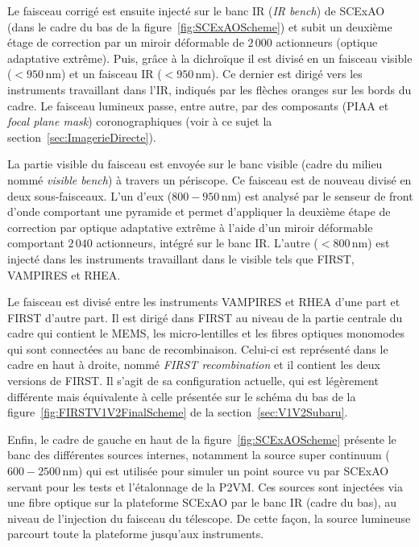 Le faisceau corrigé est ensuite injecté sur le banc \ac{IR} (\textit{IR bench}) de \ac{SCExAO} (dans le cadre du bas de la figure~\ref{fig:SCExAOScheme}) et subit un deuxième étage de correction par un miroir déformable de $2\,000$ actionneurs (optique adaptative extrême). Puis, grâce à la dichroïque il est divisé en un faisceau visible ($< 950 \,$nm) et un faisceau \ac{IR} ($< 950 \,$nm). Ce dernier est dirigé vers les instruments travaillant dans l'\ac{IR}, indiqués par les flèches oranges sur les bords du cadre. Le faisceau lumineux passe, entre autre, par des composants (\ac{PIAA} et \textit{focal plane mask}) coronographiques (voir à ce sujet la section~\ref{sec:ImagerieDirecte}).

La partie visible du faisceau est envoyée sur le banc visible (cadre du milieu nommé \textit{visible bench}) à travers un périscope. Ce faisceau est de nouveau divisé en deux sous-faisceaux. L'un d'eux ($800 - 950 \,$nm) est analysé par le senseur de front d'onde comportant une pyramide \citep{lozi2019} et permet d'appliquer la deuxième étape de correction par optique adaptative extrême à l'aide d'un miroir déformable comportant $2\,040$ actionneurs, intégré sur le banc \ac{IR}. L'autre ($< 800 \,$nm) est injecté dans les instruments travaillant dans le visible tels que \ac{FIRST}, \ac{VAMPIRES} et \ac{RHEA}.

Le faisceau est divisé entre les instruments \ac{VAMPIRES} et \ac{RHEA} d'une part et \ac{FIRST} d'autre part. Il est dirigé dans \ac{FIRST} au niveau de la partie centrale du cadre qui contient le \ac{MEMS}, les micro-lentilles et les fibres optiques monomodes qui sont connectées au banc de recombinaison. Celui-ci est représenté dans le cadre en haut à droite, nommé \textit{FIRST recombination} et il contient les deux versions de \ac{FIRST}. Il s'agit de sa configuration actuelle, qui est légèrement différente mais équivalente à celle présentée sur le schéma du bas de la figure~\ref{fig:FIRSTV1V2FinalScheme} de la section~\ref{sec:V1V2Subaru}.

Enfin, le cadre de gauche en haut de la figure~\ref{fig:SCExAOScheme} présente le banc des différentes sources internes, notamment la source super continuum ($600 - 2500 \,$nm) qui est utilisée pour simuler un point source vu par \ac{SCExAO} servant pour les tests et l'étalonnage de la \ac{P2VM}. Ces sources sont injectées via une fibre optique sur la plateforme \ac{SCExAO} par le banc \ac{IR} (cadre du bas), au niveau de l'injection du faisceau du télescope. De cette façon, la source lumineuse parcourt toute la plateforme jusqu'aux instruments.

